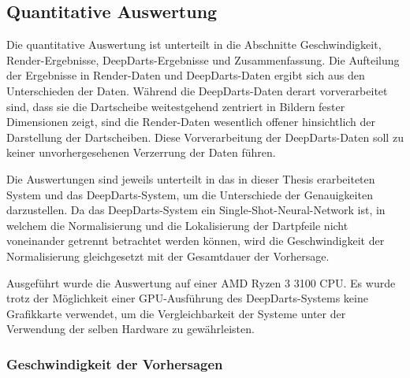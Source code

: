 
\subsection{Quantitative Auswertung}
\label{sec:cv_quantitative_auswertung}

Die quantitative Auswertung ist unterteilt in die Abschnitte Geschwindigkeit, Render-Ergebnisse, DeepDarts-Ergebnisse und Zusammenfassung. Die Aufteilung der Ergebnisse in Render-Daten und DeepDarts-Daten ergibt sich aus den Unterschieden der Daten. Während die DeepDarts-Daten derart vorverarbeitet sind, dass sie die Dartscheibe weitestgehend zentriert in Bildern fester Dimensionen zeigt, sind die Render-Daten wesentlich offener hinsichtlich der Darstellung der Dartscheiben. Diese Vorverarbeitung der DeepDarts-Daten soll zu keiner unvorhergesehenen Verzerrung der Daten führen.

Die Auswertungen sind jeweils unterteilt in das in dieser Thesis erarbeiteten System und das DeepDarts-System, um die Unterschiede der Genauigkeiten darzustellen. Da das DeepDarts-System ein Single-Shot-Neural-Network ist, in welchem die Normalisierung und die Lokalisierung der Dartpfeile nicht voneinander getrennt betrachtet werden können, wird die Geschwindigkeit der Normalisierung gleichgesetzt mit der Gesamtdauer der Vorhersage.

Ausgeführt wurde die Auswertung auf einer AMD Ryzen 3 3100 CPU. Es wurde trotz der Möglichkeit einer GPU-Ausführung des DeepDarts-Systems keine Grafikkarte verwendet, um die Vergleichbarkeit der Systeme unter der Verwendung der selben Hardware zu gewährleisten.

\subsubsection{Geschwindigkeit der Vorhersagen} %

\ExecutionTimes

